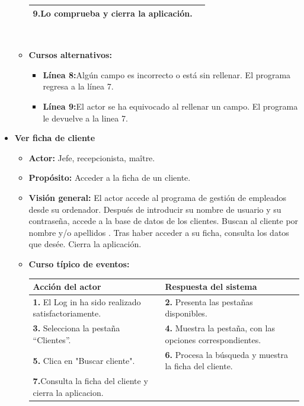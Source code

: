 \documentclass[spanish,a4paper,12pt]{report}		%
\begin{document}
\begin{itemize}
\begin{itemize}
\begin{tabular}{|p{6cm}||p{6cm}|}
				\textbf{9.}Lo comprueba y cierra la aplicación. & \textbf{} \\ \hline
			\end{tabular}
			\\
			\item \textbf{Cursos alternativos:} 
			\begin{itemize}
			\item  \textbf{Línea 8:}Algún campo es incorrecto o está sin rellenar. El programa regresa a la línea 7.
			\item  \textbf{Línea 9:}El actor se ha equivocado al rellenar un campo. El programa le devuelve a la linea 7.
			\end {itemize}
		\end{itemize}%



	\item \textbf{Ver ficha de cliente}		%
			\begin{itemize}
			\item \textbf{Actor:} Jefe, recepcionista, maître.
			\item \textbf{Propósito: } Acceder a la ficha de un cliente.
			\item \textbf{Visión general:} El actor accede al programa de gestión de empleados desde su ordenador. Después de introducir su nombre de usuario y su contraseña, accede a la base de datos de los clientes. Buscan al cliente por nombre y/o apellidos . Tras haber acceder a su ficha, consulta los datos que desée. Cierra la aplicación. 
			\item \textbf{Curso típico de eventos:} 	\\
				\begin{tabular}{|p{6cm}||p{6cm}|}
				\hline
				\textbf{Acción del actor} & \textbf{Respuesta del sistema} \\ \hline \hline
				\textbf{1.} El Log in ha sido realizado satisfactoriamente. & \textbf{2.} Presenta las pestañas disponibles.\\ \hline
				\textbf{3.} Selecciona la pestaña “Clientes”. & \textbf{4.} Muestra la pestaña, con las opciones correspondientes. \\ \hline
				\textbf{5.} Clica en "Buscar cliente".	& \textbf{6.} Procesa la búsqueda y muestra la ficha del cliente. \\ \hline
				\textbf{7.}Consulta la ficha del cliente y cierra la aplicacion.& \\ \hline
				

\end{tabular}
\end{itemize}
\end{itemize}
\end{document}
